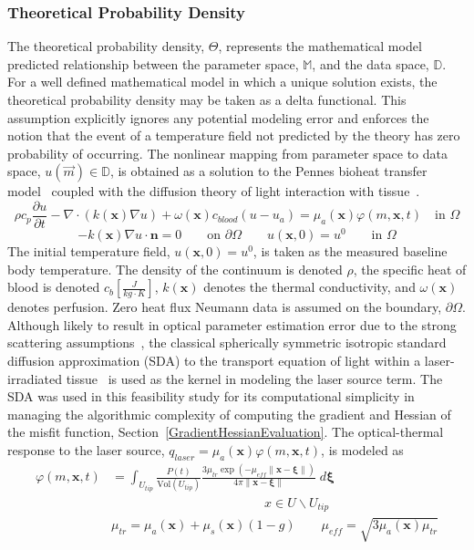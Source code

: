 \documentclass{article}
\begin{document}
\subsubsection{Theoretical Probability Density}
The theoretical probability density, $\Theta$, represents the
mathematical model predicted relationship between the parameter
space, $\mathbb{M}$, and the data space, $\mathbb{D}$. 
For a well defined mathematical model in which a unique solution
exists, the theoretical probability density may be taken as a delta
functional.
This assumption explicitly ignores any potential modeling error
and enforces the notion that the event of a temperature field not
predicted by the theory has zero probability of occurring.
The nonlinear mapping from parameter space to data space, 
$u(\vec{m}) \in \mathbb{D}$, 
is obtained as a solution to the Pennes bioheat
transfer model~\cite{Pennes1948} coupled with the
diffusion theory of light interaction with tissue~\cite{Welch95}. 
\[ 
 \rho  c_p \frac{\partial u}{\partial t}
 -\nabla \cdot ( {k(\textbf{x})} \nabla u) 
 + {\omega(\textbf{x})} c_{blood} (u - u_a )
 = {\mu_a(\textbf{x})} \varphi(m,\textbf{x},t)  \quad \text{in } \Omega
 \]
\[
   - {k(\textbf{x})} \nabla u \cdot \textbf{n} = 0
        \qquad \text{on } \partial \Omega
\qquad
   u(\textbf{x},0) = u^0 \qquad \text{in } \Omega
\]
The initial temperature field, $u(\textbf{x},0)=u^0$, 
is taken as the measured baseline body
temperature.  The density of the continuum is denoted $\rho$, the
specific heat of blood is denoted $c_{b} \left[\frac{J}{kg \cdot
K}\right]$, $k(\textbf{x})$ denotes the thermal conductivity, and
$\omega(\textbf{x})$ denotes perfusion.
Zero heat flux Neumann data is assumed on the boundary, $\partial \Omega$.
Although likely to result in optical parameter estimation 
error due to the strong scattering assumptions~\cite{carp2004radiative},
the classical
spherically symmetric isotropic standard diffusion approximation (SDA)
to the transport equation of
light within a laser-irradiated tissue~\cite{Welch95} is used as the kernel
in modeling the laser source term.  
The SDA was used in this
feasibility study for its computational simplicity in managing
the algorithmic complexity of computing the gradient and Hessian of the misfit function, 
Section~\ref{GradientHessianEvaluation}.
The optical-thermal response to the laser source,
$q_{laser} = {\mu_a(\textbf{x})} \varphi(m,\textbf{x},t)$,
is modeled as 
\[
\begin{split}
   \varphi(m,\textbf{x},t) & = 
    \int_{U_{tip}}
 \frac{P(t)  }{\text{Vol}(U_{tip}) }  
   \frac{3\mu_{tr} \exp(-\mu_{eff} \| \textbf{x} -\mathbf{ \xi}\|) }
      {4\pi \| \textbf{x}-\mathbf{ \xi}\|} \; d\mathbf{\xi}
\quad
\\
 & \hspace{2in}   x \in U \backslash U_{tip}
\\
 & 
  \mu_{tr}   = {\mu_a(\textbf{x}) } +  
               {\mu_s(\textbf{x})} (1-g)
\qquad
  \mu_{eff}  = \sqrt{3 {\mu_a(\textbf{x})} \mu_{tr}}
\end{split}
\]
\end{document}
